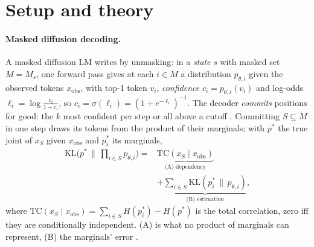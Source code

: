 %
%

\providecommand{\E}{\mathbb{E}}
\providecommand{\1}{\mathbf{1}}
\providecommand{\xobs}{x_{\mathrm{obs}}}
\ifdefined\proposition\else\newtheorem{proposition}{Proposition}\fi

\section{Setup and theory}
\label{sec:setup}

\paragraph{Masked diffusion decoding.}
A masked diffusion LM \citep{austin2021d3pm,sahoo2024mdlm,nie2025llada,ye2025dream} writes by
unmasking: in a \emph{state} $s$ with masked set $M=M_s$, one forward pass gives at each $i\in M$ a
distribution $p_{\theta,i}$ given the observed tokens $\xobs$, with top-1 token $v_i$,
\emph{confidence} $c_i=p_{\theta,i}(v_i)$ and log-odds $\ell_i=\log\frac{c_i}{1-c_i}$, so
$c_i=\sigma(\ell_i)=(1+e^{-\ell_i})^{-1}$. The
decoder \emph{commits} positions for good: the $k$ most confident per step
\citep{chang2022maskgit} or all above a cutoff \citep{wu2025fastdllm}. Committing $S\subseteq M$ in one step draws its tokens from the product
of their marginals; with $p^*$ the true joint of $x_S$ given $\xobs$ and $p^*_i$ its marginals,
\begin{equation}
  \begin{split}
  \mathrm{KL}\bigl(p^* \,\|\, {\textstyle\prod_{i\in S}} p_{\theta,i}\bigr)
  = {} & \underbrace{\mathrm{TC}(x_S \mid \xobs)}_{\text{(A) dependency}} \\
  & + \underbrace{\sum_{i\in S}\mathrm{KL}(p^*_i \,\|\, p_{\theta,i})}_{\text{(B) estimation}} ,
  \end{split}
  \label{eq:decomp}
\end{equation}
where $\mathrm{TC}(x_S\mid\xobs)=\sum_{i\in S}H(p^*_i)-H(p^*)$ is the total correlation, zero
iff they are conditionally independent. (A) is what no product of marginals can
represent, (B) the marginals' error \citep[cf.][]{benhamu2025entropy}.

